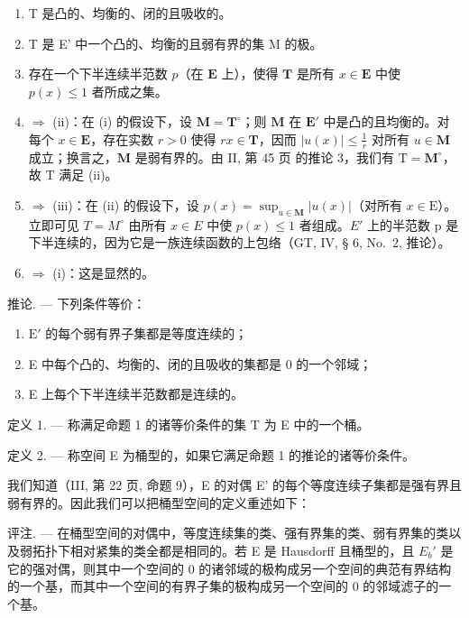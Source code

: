 \begin{enumerate}
\def\labelenumi{(\roman{enumi})}
\item
  T 是凸的、均衡的、闭的且吸收的。
\item
  T 是 E' 中一个凸的、均衡的且弱有界的集 M 的极。
\item
  存在一个下半连续半范数 \(p\)（在 \(\mathbf{E}\) 上），使得 \(\mathbf{T}\) 是所有 \(x \in \mathbf{E}\) 中使 \(p(x) \leqslant 1\) 者所成之集。
\item
  \(\Rightarrow\) (ii)：在 (i) 的假设下，设 \(\mathbf{M} = \mathbf{T}^{\circ}\)；则 \(\mathbf{M}\) 在 \(\mathbf{E}'\) 中是凸的且均衡的。对每个 \(x \in \mathbf{E}\)，存在实数 \(r > 0\) 使得 \(rx \in \mathbf{T}\)，因而 \(|u(x)| \leqslant \frac{1}{r}\) 对所有 \(u \in \mathbf{M}\) 成立；换言之，\(\mathbf{M}\) 是弱有界的。由 II, 第 45 页 的推论 3，我们有 \(\mathrm{T} = \mathbf{M}^{\circ}\)，故 \(\mathrm{T}\) 满足 (ii)。
\item
  \(\Rightarrow\) (iii)：在 (ii) 的假设下，设 \(p(x) = \sup_{u\in \mathbf{M}}|u(x)|\)（对所有 \(x\in \mathrm{E}\)）。立即可见 \(T = M^{\circ}\) 由所有 \(x \in E\) 中使 \(p(x) \leqslant 1\) 者组成。\(E'\) 上的半范数 p 是下半连续的，因为它是一族连续函数的上包络（GT, IV, § 6, No.~2, 推论）。
\item
  \(\Rightarrow\) (i)：这是显然的。
\end{enumerate}

推论. --- 下列条件等价：

\begin{enumerate}
\def\labelenumi{(\roman{enumi})}
\item
  \(\mathrm{E}'\) 的每个弱有界子集都是等度连续的；
\item
  E 中每个凸的、均衡的、闭的且吸收的集都是 0 的一个邻域；
\item
  E 上每个下半连续半范数都是连续的。
\end{enumerate}

定义 1. --- 称满足命题 1 的诸等价条件的集 T 为 E 中的一个桶。

定义 2. --- 称空间 E 为桶型的，如果它满足命题 1 的推论的诸等价条件。

我们知道（III, 第 22 页, 命题 9），E 的对偶 E' 的每个等度连续子集都是强有界且弱有界的。因此我们可以把桶型空间的定义重述如下：

评注. --- 在桶型空间的对偶中，等度连续集的类、强有界集的类、弱有界集的类以及弱拓扑下相对紧集的类全都是相同的。若 E 是 Hausdorff 且桶型的，且 \(E_{b}'\) 是它的强对偶，则其中一个空间的 0 的诸邻域的极构成另一个空间的典范有界结构的一个基，而其中一个空间的有界子集的极构成另一个空间的 0 的邻域滤子的一个基。

